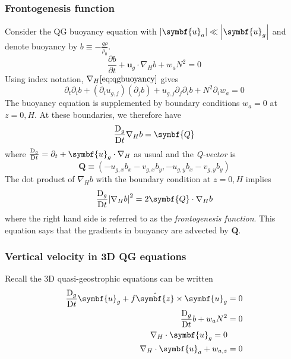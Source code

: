 \documentclass{jknotes}
\begin{document}
\subsubsection{Frontogenesis function}
Consider the QG buoyancy equation with $\abs{\symbf{u}_a} \ll
\abs{\symbf{u}_g}$ and denote buoyancy by $b \equiv -\frac{g\rho}{\rho_0}$.
\begin{equation}
	\frac{\partial b}{\partial t} + \symbf{u}_g \cdot \nabla_H b + w_a N^2 = 0
	\label{eq:qgbuoyancy}
\end{equation}
Using index notation, $\nabla_H \eqref{eq:qgbuoyancy}$ gives
\begin{equation}
	\partial_t \partial_i b + (\partial_i u_{g,j})(\partial_j b) +
	u_{g,j}\partial_j \partial_i b + N^2 \partial_i w_a = 0
\end{equation}
The buoyancy equation is supplemented by boundary conditions $w_a = 0$ at
$z=0, H$. At these boundaries, we therefore have
\begin{equation}
	\frac{\diffD_g}{\diffD t} \nabla_H b = \symbf{Q}
\end{equation}
where $\frac{\diffD_g}{\diffD t} = \partial_t + \symbf{u}_g \cdot \nabla_H$ as
usual and the \emph{Q-vector} is
\begin{equation}
	\symbf{Q} \equiv (-u_{g,x} b_x - v_{g,x} b_y, -u_{g,y} b_x - v_{g,y}b_y)
\end{equation}
The dot product of $\nabla_H b$ with the boundary condition at $z=0,H$ implies
\begin{equation}
	\frac{\diffD_g}{\diffD t} \abs{\nabla_H b}^2 = 2\symbf{Q}\cdot\nabla_H b
	\label{eq:frontogenesis}
\end{equation}
where the right hand side is referred to as the \emph{frontogenesis function}.
This equation says that the gradients in buoyancy are advected by $\symbf{Q}$.

\subsubsection{Vertical velocity in 3D QG equations}
Recall the 3D quasi-geostrophic equations can be written
\begin{align}
	\frac{\diffD_g}{\diffD t} \symbf{u}_g + f \hat{\symbf{z}}\times
	\symbf{u}_g &= 0 \label{eq:3dqg.1} \\
	\frac{\diffD_g}{\diffD t} b + w_a N^2 &= 0 \label{eq:3dqg.2} \\
	\nabla_H \cdot \symbf{u}_g = 0 \label{eq:3dqg.3} \\
	\nabla_H \cdot \symbf{u}_a + w_{a,z} &= 0 \label{eq:3dqg.4}
\end{align}
\end{document}
